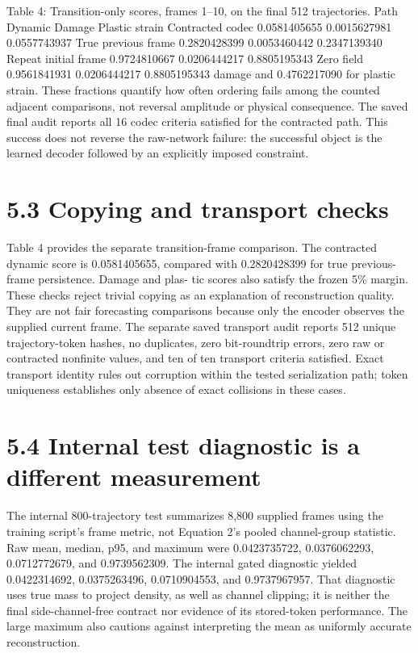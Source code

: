 \documentclass[11pt]{article}
\begin{document}
Table 4: Transition-only scores, frames 1–10, on the final 512 trajectories.
Path Dynamic Damage Plastic strain
Contracted codec 0.0581405655 0.0015627981 0.0557743937
True previous frame 0.2820428399 0.0053460442 0.2347139340
Repeat initial frame 0.9724810667 0.0206444217 0.8805195343
Zero field 0.9561841931 0.0206444217 0.8805195343
damage and 0.4762217090 for plastic strain. These fractions quantify how often ordering fails
among the counted adjacent comparisons, not reversal amplitude or physical consequence. The
saved final audit reports all 16 codec criteria satisfied for the contracted path. This success does
not reverse the raw-network failure: the successful object is the learned decoder followed by an
explicitly imposed constraint.

\section*{5.3 Copying and transport checks}

Table 4 provides the separate transition-frame comparison. The contracted dynamic score is
0.0581405655, compared with 0.2820428399 for true previous-frame persistence. Damage and plas-
tic scores also satisfy the frozen 5\% margin. These checks reject trivial copying as an explanation of
reconstruction quality. They are not fair forecasting comparisons because only the encoder observes
the supplied current frame.
The separate saved transport audit reports 512 unique trajectory-token hashes, no duplicates,
zero bit-roundtrip errors, zero raw or contracted nonfinite values, and ten of ten transport criteria
satisfied. Exact transport identity rules out corruption within the tested serialization path; token
uniqueness establishes only absence of exact collisions in these cases.

\section*{5.4 Internal test diagnostic is a different measurement}

The internal 800-trajectory test summarizes 8,800 supplied frames using the training script’s frame
metric, not Equation 2’s pooled channel-group statistic. Raw mean, median, p95, and maximum
were 0.0423735722, 0.0376062293, 0.0712772679, and 0.9739562309. The internal gated diagnostic
yielded 0.0422314692, 0.0375263496, 0.0710904553, and 0.9737967957. That diagnostic uses true
mass to project density, as well as channel clipping; it is neither the final side-channel-free contract
nor evidence of its stored-token performance. The large maximum also cautions against interpreting
the mean as uniformly accurate reconstruction.
\end{document}
